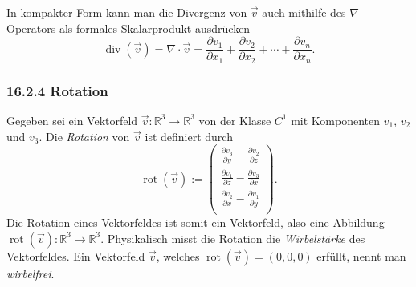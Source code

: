 \documentclass[a4paper,landscape,8pt]{extarticle}
\newcommand{\R}{\mathbb{R}}
\renewcommand\div{\operatorname{div}}
\DeclareMathOperator{\rot}{rot}
\begin{document}
\begin{multicols*}{4}
In kompakter Form kann man die Divergenz von $\vec{v}$ auch mithilfe des
$\nabla$-Operators als formales Skalarprodukt ausdrücken
\[
\div(\vec{v})=\nabla\cdot\vec{v}=\frac{\partial{v_1}}{\partial{x_1}} +
\frac{\partial{v_2}}{\partial{x_2}} + \cdots +
\frac{\partial{v_n}}{\partial{x_n}}.
\]

\subsubsection{16.2.4 Rotation}

\Def Gegeben sei ein Vektorfeld $\vec{v}\colon\R^3\to\R^3$ von der Klasse $C^1$
mit Komponenten $v_1$, $v_2$ und $v_3$. Die \emph{Rotation} von $\vec{v}$ ist
definiert durch
\[
\rot(\vec{v}) := 
\begin{pmatrix}
\frac{\partial v_3}{\partial y} - \frac{\partial v_2}{\partial z}\\
\frac{\partial v_1}{\partial z} - \frac{\partial v_3}{\partial x}\\
\frac{\partial v_2}{\partial x} - \frac{\partial v_1}{\partial y}\\
\end{pmatrix}.
\]
Die Rotation eines Vektorfeldes ist somit ein Vektorfeld, also eine Abbildung
$\rot(\vec{v})\colon\R^3\to\R^3$. Physikalisch misst die Rotation die
\emph{Wirbelstärke} des Vektorfeldes. Ein Vektorfeld $\vec{v}$, welches
$\rot(\vec{v})=(0,0,0)$ erfüllt, nennt man \emph{wirbelfrei}.


\end{multicols*}
\end{document}
